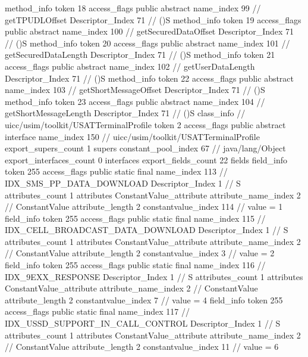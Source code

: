 {{{{{				}
				method_info {
					token	18
					access_flags	public abstract
					name_index	99		// getTPUDLOffset
					Descriptor_Index	71		// ()S
				}
				method_info {
					token	19
					access_flags	public abstract
					name_index	100		// getSecuredDataOffset
					Descriptor_Index	71		// ()S
				}
				method_info {
					token	20
					access_flags	public abstract
					name_index	101		// getSecuredDataLength
					Descriptor_Index	71		// ()S
				}
				method_info {
					token	21
					access_flags	public abstract
					name_index	102		// getUserDataLength
					Descriptor_Index	71		// ()S
				}
				method_info {
					token	22
					access_flags	public abstract
					name_index	103		// getShortMessageOffset
					Descriptor_Index	71		// ()S
				}
				method_info {
					token	23
					access_flags	public abstract
					name_index	104		// getShortMessageLength
					Descriptor_Index	71		// ()S
				}
			}
		}
		class_info {		// uicc/usim/toolkit/USATTerminalProfile
			token	2
			access_flags	public abstract interface
			name_index	150		// uicc/usim/toolkit/USATTerminalProfile
			export_supers_count	1
			supers {
				constant_pool_index	67		// java/lang/Object
			}
			export_interfaces_count	0
			interfaces {
			}
			export_fields_count	22
			fields {
			field_info {
				token	255
				access_flags	public static final
				name_index	113		// IDX_SMS_PP_DATA_DOWNLOAD
				Descriptor_Index	1		// S
				attributes_count	1
				attributes {
				ConstantValue_attribute {
					attribute_name_index	2		// ConstantValue
					attribute_length	2
					constantvalue_index	114		// value = 1
				}
				}
			}
			field_info {
				token	255
				access_flags	public static final
				name_index	115		// IDX_CELL_BROADCAST_DATA_DOWNLOAD
				Descriptor_Index	1		// S
				attributes_count	1
				attributes {
				ConstantValue_attribute {
					attribute_name_index	2		// ConstantValue
					attribute_length	2
					constantvalue_index	3		// value = 2
				}
				}
			}
			field_info {
				token	255
				access_flags	public static final
				name_index	116		// IDX_9EXX_RESPONSE
				Descriptor_Index	1		// S
				attributes_count	1
				attributes {
				ConstantValue_attribute {
					attribute_name_index	2		// ConstantValue
					attribute_length	2
					constantvalue_index	7		// value = 4
				}
				}
			}
			field_info {
				token	255
				access_flags	public static final
				name_index	117		// IDX_USSD_SUPPORT_IN_CALL_CONTROL
				Descriptor_Index	1		// S
				attributes_count	1
				attributes {
				ConstantValue_attribute {
					attribute_name_index	2		// ConstantValue
					attribute_length	2
					constantvalue_index	11		// value = 6
}}}}}}}
